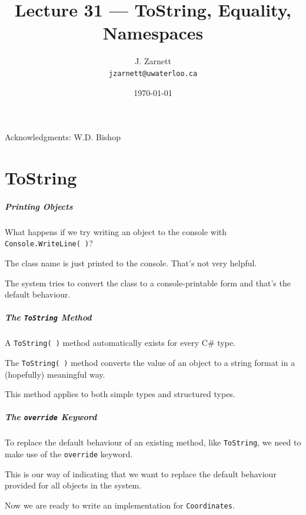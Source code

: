 

\title{Lecture 31 --- ToString, Equality, Namespaces}

\author{J. Zarnett\\
\texttt{jzarnett@uwaterloo.ca}}
\date{\today}



\begin{frame}
  \titlepage
  
  \begin{center}
  \small{Acknowledgments: W.D. Bishop}
  \end{center}
\end{frame}

\part{ToString}
\begin{frame}\partpage\end{frame}


\begin{frame}
\frametitle{Printing Objects}

What happens if we try writing  an object to the console with \texttt{Console.WriteLine( )}?

The class name is just printed to the console. That's not very helpful.

The system tries to convert the class to a console-printable form and that's the default behaviour. 

\end{frame}

\begin{frame}
\frametitle{The \texttt{ToString} Method}
A \texttt{ToString( )} method automatically exists for every C\# type.

The \texttt{ToString( )} method converts the value of an object to a string format in a (hopefully) meaningful way.

This method applies to both simple types and structured types.
\end{frame}

\begin{frame}
\frametitle{The \texttt{override} Keyword}
To replace the default behaviour of an existing method, like \texttt{ToString}, we need to make use of the \alert{\texttt{override}} keyword.

This is our way of indicating that we want to replace the default behaviour provided for all objects in the system.

Now we are ready to write an implementation for \texttt{Coordinates}.

\end{frame}



